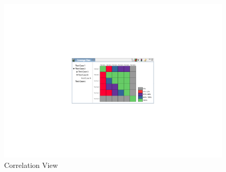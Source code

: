 \begin{figure}[hbt]
 \centering
 \includegraphics[width=1.0\textwidth]{images/Correlation_View/CorrelationView}
 \caption{Correlation View}
 \label{ui_fg:Correlation View}
\end{figure}
